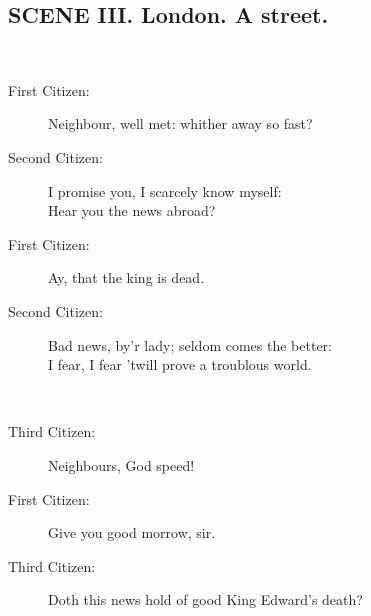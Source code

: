 \documentclass{article}
\begin{document}
\subsection*{SCENE III.  London. A street.}
\\
\begin{description}
\item[First Citizen:] 
\hspace{1pt}Neighbour, well met: whither away so fast?\\
\end{description}
\begin{description}
\item[Second Citizen:] 
\hspace{1pt}I promise you, I scarcely know myself:\\
\hspace{1pt}Hear you the news abroad?\\
\end{description}
\begin{description}
\item[First Citizen:] 
\hspace{1pt}Ay, that the king is dead.\\
\end{description}
\begin{description}
\item[Second Citizen:] 
\hspace{1pt}Bad news, by'r lady; seldom comes the better:\\
\hspace{1pt}I fear, I fear 'twill prove a troublous world.\\
\end{description}
\\
\begin{description}
\item[Third Citizen:] 
\hspace{1pt}Neighbours, God speed!\\
\end{description}
\begin{description}
\item[First Citizen:] 
\hspace{1pt}Give you good morrow, sir.\\
\end{description}
\begin{description}
\item[Third Citizen:] 
\hspace{1pt}Doth this news hold of good King Edward's death?\\
\end{description}
\end{document}
